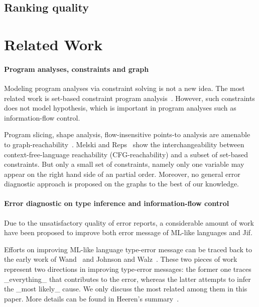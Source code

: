 \subsection{Ranking quality}

\section{Related Work}

\paragraph{Program analyses, constraints and graph} 

Modeling program analyses via constraint solving is not a new idea. The most
related work is set-based constraint program
analysis~\cite{aiken-setconstraint, aiken-typeinclusion}.  However, such
constraints does not model hypothesis, which is important in program analyses
such as information-flow control.
 
Program slicing, shape analysis, flow-insensitive points-to analysis are
amenable to graph-reachability~\cite{reps-graph}. Melski and
Reps~\cite{melski-cflgraph} show the interchangeability between
context-free-language reachability (CFG-reachability) and a subset of
set-based constraints. But only a small set of constraints, namely
only one variable may appear on the right hand side of an partial
order. Moreover, no general error diagnostic approach is proposed on
the graphs to the best of our knowledge. 

\paragraph{Error diagnostic on type inference and information-flow
control} 

Due to the unsatisfactory quality of error reports, a considerable
amount of work have been proposed to improve both error message of
ML-like languages and Jif.

Efforts on improving ML-like language type-error message can be traced back to
the early work of Wand~\cite{wand-errorfinding} and Johnson and
Walz~\cite{johnson-popl86}. These two pieces of work represent two directions
in improving type-error messages: the former one traces _everything_ that
contributes to the error, whereas the latter attempts to infer the _most
likely_ cause. We only discuss the most related among them in this paper. More
details can be found in Heeren's summary~\cite{heeren:thesis}.

